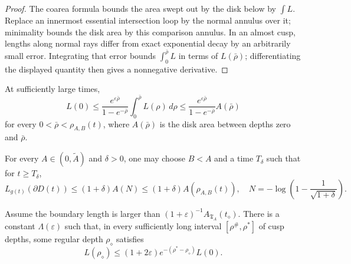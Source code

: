 \begin{proof}
\sketch
The coarea formula bounds the area swept out by the disk below by
\(\int L\).  Replace an innermost essential intersection loop by the normal
annulus over it; minimality bounds the disk area by this comparison annulus.
In an almost cusp, lengths along normal rays differ from exact exponential
decay by an arbitrarily small error.  Integrating that error bounds
\(\int_0^{\bar\rho}L\) in terms of \(L(\bar\rho)\); differentiating the displayed
quantity then gives a nonnegative derivative.
\end{proof}

\begin{corollary}
\label{cor:chow-iv-cusp-length-by-swept-area}


At sufficiently large times,
\[
 L(0)\le
 \frac{e^{\varepsilon\bar\rho}}{1-e^{-\bar\rho}}
 \int_0^{\bar\rho}L(\rho)\,d\rho
 \le\frac{e^{\varepsilon\bar\rho}}{1-e^{-\bar\rho}}A(\bar\rho)
\]
for every \(0<\bar\rho<\rho_{A,B}(t)\), where \(A(\bar\rho)\) is the disk area
between depths zero and \(\bar\rho\).
\end{corollary}

\begin{corollary}
\label{cor:chow-iv-area-almost-bounds-length}


For every \(A\in(0,\widetilde A)\) and \(\delta>0\), one may choose \(B<A\)
and a time \(T_\delta\) such that for \(t\ge T_\delta\),
\[
 L_{g(t)}(\partial D(t))\le(1+\delta)A(N)
 \le(1+\delta)A(\rho_{A,B}(t)),
 \quad N=-\log\left(1-\frac1{\sqrt{1+\delta}}\right).
\]
\end{corollary}

\begin{lemma}
\label{lem:chow-iv-short-loop-deep-cusp}


Assume the boundary length is larger than
\((1+\varepsilon)^{-1}A_{\mathfrak T_A}(t_\diamond)\).  There is a constant
\(\Lambda(\varepsilon)\) such that, in every sufficiently long interval
\([\rho^\#,\rho^*]\) of cusp depths, some regular depth \(\rho_\diamond\) satisfies
\[
 L(\rho_\diamond)\le(1+2\varepsilon)
 e^{-(\rho^*-\rho_\diamond)}L(0).
\]
\end{lemma}

